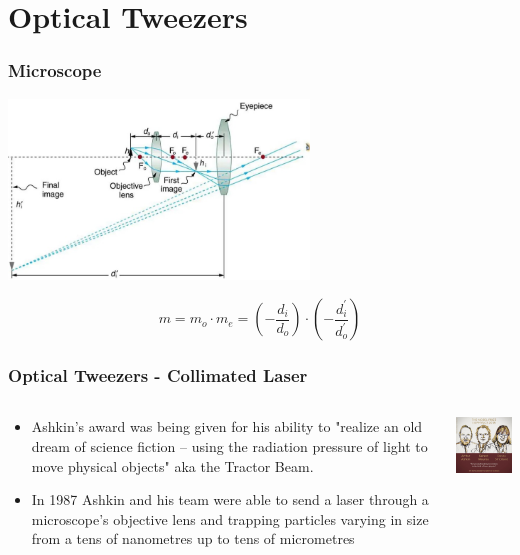 \documentclass{beamer}
\begin{document}
\section{Optical Tweezers}

\begin{frame}\frametitle{Microscope}
\begin{center}
\includegraphics[width=8cm]{fig/microscope1.jpg}
\end{center}

\[ m = m_o \cdot m_e = (-\frac{d_i}{d_o}) \cdot (-\frac{d_i^\prime}{d_o^\prime}) \]

\end{frame}

\begin{frame}\frametitle{Optical Tweezers -  Collimated Laser}
\begin{columns}
\begin{column}{7cm}
\begin{itemize}
\item Ashkin's award was being given for his ability to "realize an old dream of science fiction – using the radiation pressure of light to move physical objects" aka the Tractor Beam.
\item In 1987 Ashkin and his team were able to send a laser through a microscope's objective lens and trapping particles varying in size from a tens of nanometres up to tens of micrometres
\end{itemize}
\end{column}
\begin{column}{4cm}
\begin{center}
\includegraphics[width=4cm]{fig/nobel2018.jpg}
\end{center}
\end{column}
\end{columns}
\end{frame}
\end{document}
